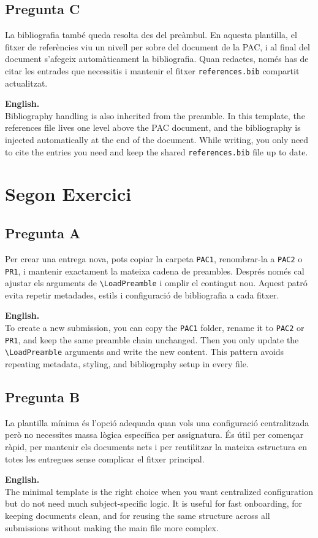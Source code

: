 		\subsection{Pregunta C}
			La bibliografia també queda resolta des del preàmbul. En aquesta plantilla, el fitxer de referències viu un nivell per sobre del document de la PAC, i al final del document s'afegeix automàticament la bibliografia. Quan redactes, només has de citar les entrades que necessitis i mantenir el fitxer \texttt{references.bib} compartit actualitzat.
			\par\bigskip
			\textbf{English.}\\
			 Bibliography handling is also inherited from the preamble. In this template, the references file lives one level above the PAC document, and the bibliography is injected automatically at the end of the document. While writing, you only need to cite the entries you need and keep the shared \texttt{references.bib} file up to date.
	\newpage
	\section[Exercici 2]{Segon Exercici}

		\subsection{Pregunta A}
			Per crear una entrega nova, pots copiar la carpeta \texttt{PAC1}, renombrar-la a \texttt{PAC2} o \texttt{PR1}, i mantenir exactament la mateixa cadena de preambles. Després només cal ajustar els arguments de \verb|\LoadPreamble| i omplir el contingut nou. Aquest patró evita repetir metadades, estils i configuració de bibliografia a cada fitxer.
			\par\bigskip
			\textbf{English.}\\
			To create a new submission, you can copy the \texttt{PAC1} folder, rename it to \texttt{PAC2} or \texttt{PR1}, and keep the same preamble chain unchanged. Then you only update the \verb|\LoadPreamble| arguments and write the new content. This pattern avoids repeating metadata, styling, and bibliography setup in every file.

		\subsection{Pregunta B}
			La plantilla mínima és l'opció adequada quan vols una configuració centralitzada però no necessites massa lògica específica per assignatura. És útil per començar ràpid, per mantenir els documents nets i per reutilitzar la mateixa estructura en totes les entregues sense complicar el fitxer principal.
			\par\bigskip
			\textbf{English.}\\The minimal template is the right choice when you want centralized configuration but do not need much subject-specific logic. It is useful for fast onboarding, for keeping documents clean, and for reusing the same structure across all submissions without making the main file more complex.

